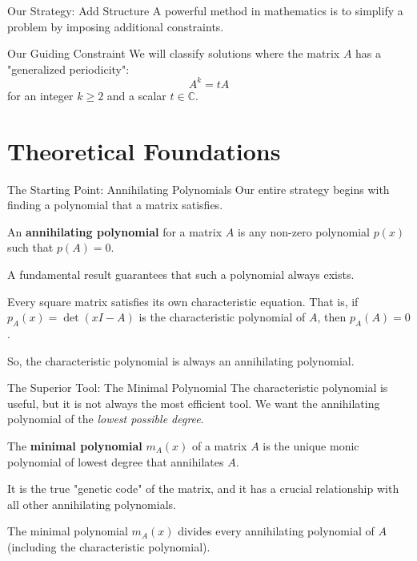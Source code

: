\documentclass{beamer}
\begin{document}
\begin{frame}{Our Strategy: Add Structure}
  A powerful method in mathematics is to simplify a problem by imposing additional constraints.
  \vfill %
  \begin{alertblock}{Our Guiding Constraint}
  We will classify solutions where the matrix $A$ has a "generalized periodicity":
  \[ A^k = tA \]
    for an integer $k \ge 2$ and a scalar $t \in \mathbb{C}$.
  \end{alertblock}
\end{frame}

\section{Theoretical Foundations}

\begin{frame}{The Starting Point: Annihilating Polynomials}
  Our entire strategy begins with finding a polynomial that a matrix satisfies.
  \begin{definition}
    An \textbf{annihilating polynomial} for a matrix $A$ is any non-zero polynomial $p(x)$ such that $p(A) = 0$.
  \end{definition}
  \vfill
  A fundamental result guarantees that such a polynomial always exists.
  \begin{theorem}
    Every square matrix satisfies its own characteristic equation. That is, if $p_A(x) = \det(xI - A)$ is the characteristic polynomial of $A$, then $p_A(A) = 0$.
  \end{theorem}
  \vfill
  So, the characteristic polynomial is always an annihilating polynomial.
\end{frame}

\begin{frame}{The Superior Tool: The Minimal Polynomial}
  The characteristic polynomial is useful, but it is not always the most efficient tool. We want the annihilating polynomial of the \textit{lowest possible degree}.
  \begin{definition}
    The \textbf{minimal polynomial} $m_A(x)$ of a matrix $A$ is the unique monic polynomial of lowest degree that annihilates $A$.
  \end{definition}
  \vfill
  It is the true "genetic code" of the matrix, and it has a crucial relationship with all other annihilating polynomials.
  \begin{theorem}
    The minimal polynomial $m_A(x)$ divides every annihilating polynomial of $A$ (including the characteristic polynomial).
  \end{theorem}
\end{frame}
\end{document}
